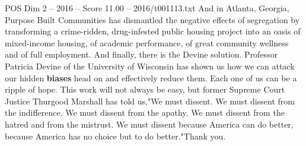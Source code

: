 \begin{textsample}{POS Dim 2 – 2016 – Score 11.00 – 2016/t001113.txt}
And in Atlanta, Georgia, Purpose Built Communities has dismantled the negative effects of segregation by transforming a crime-ridden, drug-infested public housing project into an oasis of mixed-income housing, of academic performance, of great community wellness and of full employment.
And finally, there is the Devine solution.
Professor Patricia Devine of the University of Wisconsin has shown us how we can attack our hidden \textbf{biases} head on and effectively reduce them.
Each one of us can be a ripple of hope.
This work will not always be easy, but former Supreme Court Justice Thurgood Marshall has told us,"We must dissent.
We must dissent from the indifference.
We must dissent from the apathy.
We must dissent from the hatred and from the mistrust.
We must dissent because America can do better, because America has no choice but to do better."Thank you.

\end{textsample}
